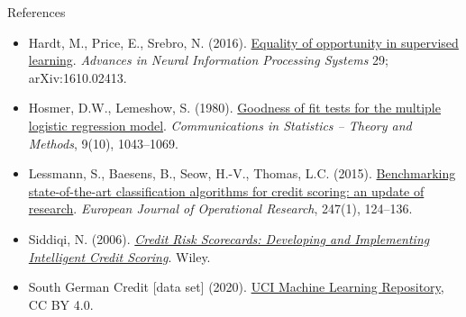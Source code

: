 \begin{frame}{References}
\begin{itemize}
    \item Hardt, M., Price, E., Srebro, N. (2016). \href{https://arxiv.org/abs/1610.02413}{Equality of opportunity in supervised learning}. \textit{Advances in Neural Information Processing Systems} 29; arXiv:1610.02413.
    \item Hosmer, D.W., Lemeshow, S. (1980). \href{https://doi.org/10.1080/03610928008827941}{Goodness of fit tests for the multiple logistic regression model}. \textit{Communications in Statistics -- Theory and Methods}, 9(10), 1043--1069.
    \item Lessmann, S., Baesens, B., Seow, H.-V., Thomas, L.C. (2015). \href{https://doi.org/10.1016/j.ejor.2015.05.030}{Benchmarking state-of-the-art classification algorithms for credit scoring: an update of research}. \textit{European Journal of Operational Research}, 247(1), 124--136.
    \item Siddiqi, N. (2006). \href{https://doi.org/10.1002/9781119201731}{\textit{Credit Risk Scorecards: Developing and Implementing Intelligent Credit Scoring}}. Wiley.
    \item South German Credit [data set] (2020). \href{https://doi.org/10.24432/C5QG88}{UCI Machine Learning Repository}, CC BY 4.0.
\end{itemize}
\end{frame}


